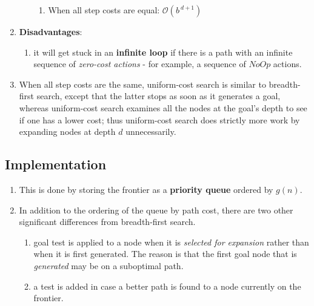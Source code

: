 \begin{enumerate}[itemsep=0.2cm]
\begin{enumerate}[itemsep=0.2cm]
\begin{enumerate}[itemsep=0.2cm]
            \item When all step costs are equal: $\mathcal{O}(b^{\ d+1})$
            \hfill \cite{ai/book/Artificial-Intelligence-A-Modern-Approach/Russell-Norvig}
        \end{enumerate}
    \end{enumerate}

    \item \textbf{Disadvantages}:
    \begin{enumerate}[itemsep=0.2cm]
        \item it will get stuck in an \textbf{infinite loop} if there is a path with an infinite sequence of \textit{zero-cost actions} - for example, a sequence of $NoOp$ actions.
        \hfill \cite{ai/book/Artificial-Intelligence-A-Modern-Approach/Russell-Norvig}
    \end{enumerate}

    \item When all step costs are the same, uniform-cost search is similar to breadth-first search, except that the latter stops as soon as it generates a goal, whereas uniform-cost search examines all the nodes at the goal’s depth to see if one has a lower cost; thus uniform-cost search does strictly more work by expanding nodes at depth $d$ unnecessarily.
    \hfill \cite{ai/book/Artificial-Intelligence-A-Modern-Approach/Russell-Norvig}
\end{enumerate}




\subsection{Implementation}

\begin{enumerate}
    \item  This is done by storing the frontier as a \textbf{priority queue} ordered by $g(n)$. 
    \hfill \cite{ai/book/Artificial-Intelligence-A-Modern-Approach/Russell-Norvig}

    \item In addition to the ordering of the queue by path cost, there are two other significant differences from breadth-first search.
    \hfill \cite{ai/book/Artificial-Intelligence-A-Modern-Approach/Russell-Norvig}
    \begin{enumerate}
        \item  goal test is applied to a node when it is \textit{selected for expansion} rather than when it is first generated.
        The reason is that the first goal node that is \textit{generated} may be on a suboptimal path.
        \hfill \cite{ai/book/Artificial-Intelligence-A-Modern-Approach/Russell-Norvig}

        \item a test is added in case a better path is found to a node currently on the frontier.
        \hfill \cite{ai/book/Artificial-Intelligence-A-Modern-Approach/Russell-Norvig}
    \end{enumerate}

\end{enumerate}

